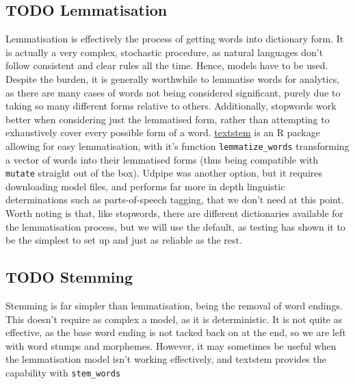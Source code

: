 \documentclass[a4paper, 11pt]{article}
\begin{document}
\subsection{{\bfseries\sffamily TODO} Lemmatisation}
\label{sec:org5998a0e}
Lemmatisation is effectively the process of getting words into
dictionary form. It is actually a very complex, stochastic procedure,
as natural languages don't follow consistent and clear rules all the
time. Hence, models have to be used. Despite the burden, it is
generally worthwhile to lemmatise words for analytics, as there are
many cases of words not being considered significant, purely due to
taking so many different forms relative to others. Additionally,
stopwords work better when considering just the lemmatised form,
rather than attempting to exhaustively cover every possible form of a
word. \href{https://github.com/trinker/textstem/}{textstem} is an R package allowing for easy lemmatisation, with
it's function \texttt{lemmatize\_words} transforming a vector of words into
their lemmatised forms (thus being compatible with \texttt{mutate} straight
out of the box). Udpipe was another option, but it requires
downloading model files, and performs far more in depth linguistic
determinations such as parts-of-speech tagging, that we don't need at
this point. Worth noting is that, like stopwords, there are different
dictionaries available for the lemmatisation process, but we will use
the default, as testing has shown it to be the simplest to set up and
just as reliable as the rest.
\subsection{{\bfseries\sffamily TODO} Stemming}
\label{sec:orgde51cd4}
Stemming is far simpler than lemmatisation, being the removal of word
endings. This doesn't require as complex a model, as it is
deterministic. It is not quite as effective, as the base word ending
is not tacked back on at the end, so we are left with word stumps and
morphemes. However, it may sometimes be useful when the lemmatisation
model isn't working effectively, and textstem provides the capability
with \texttt{stem\_words}
\end{document}
